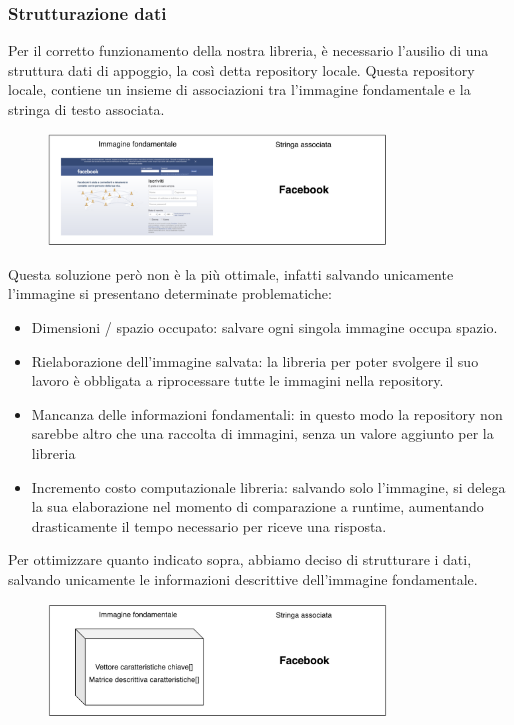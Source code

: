 \documentclass[twoside]{supsistudent}
\newcommand{\Decaa}{\newline\vspace{0.5mm}\newline\noindent}
\begin{document}
\subsubsection{Strutturazione dati}
Per il corretto funzionamento della nostra libreria, è necessario l'ausilio di una struttura dati di appoggio, la così detta repository locale.
\Decaa
Questa repository locale, contiene un insieme di associazioni tra l'immagine fondamentale e la stringa di testo associata.
\begin{figure}[h!]
  \centering
    \includegraphics[width=0.8\textwidth]{Pictures/img_fondamentale.png}
\end{figure}
\newline
Questa soluzione però non è la più ottimale, infatti salvando unicamente l'immagine si presentano determinate problematiche:
\begin{itemize}
\item Dimensioni / spazio occupato: salvare ogni singola immagine occupa spazio.
\item Rielaborazione dell'immagine salvata: la libreria per poter svolgere il suo lavoro è obbligata a riprocessare tutte le immagini nella repository.
\item Mancanza delle informazioni fondamentali: in questo modo la repository non sarebbe altro che una raccolta di immagini, senza un valore aggiunto per la libreria
\item Incremento costo computazionale libreria: salvando solo l'immagine, si delega la sua elaborazione nel momento di comparazione a runtime, aumentando drasticamente il tempo necessario per riceve una risposta.
\end{itemize}
Per ottimizzare quanto indicato sopra, abbiamo deciso di strutturare i dati, salvando unicamente le informazioni descrittive dell'immagine fondamentale.
\begin{figure}[h!]
  \centering
    \includegraphics[width=0.8\textwidth]{Pictures/img_fondamentale_preproc.png}
\end{figure}
\newline
\end{document}
